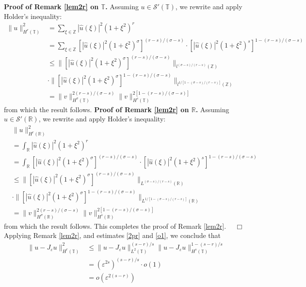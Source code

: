 \documentclass[12pt,reqno]{amsart}
\newcommand{\rr}{\mathbb{R}}
\newcommand{\zz}{\mathbb{Z}}
\newcommand{\ci}{\mathbb{T}}
\newcommand{\ee}{\varepsilon}
\theoremstyle{plain}  %
\theoremstyle{definition}
\begin{document}
{\bf Proof of Remark \ref{lem2r} on $\ci$.}
Assuming $u \in \mathcal{S'(\ci)}$,
we rewrite and apply Holder's inequality:
\begin{equation*}
	\begin{split}
		\|u\|_{H^{r}(\ci)}^2
		& = \sum_{\xi \in \zz} |\widehat{u}(\xi)|^2 (1 + \xi^2)^{r}
		\\
		& = \sum_{\xi \in \zz}
		\left [|\widehat{u}(\xi)|^2 (1 + \xi^2)^\sigma \right ]^{(r-s)/(\sigma -s)}
		\cdot \left [ |\widehat{u}(\xi )
		|^2 (1+ \xi^2)^s \right ] ^{1 - (r-s)/(\sigma -s)} 
		\\
		& \le \|\left[ |\widehat{u}(\xi)|^2 (1 + \xi^2)^\sigma
		\right]^{(r-s)/(\sigma -s)} \|_{l^{(\sigma -s)/(r-s)}(\zz)}
		\\
		& \cdot \|\left[ |\widehat{u}(\xi)|^2 (1 + \xi^2)^\sigma
		\right]^{1- (r-s)/(\sigma -s)} \|_{l^{1/[1 -(\sigma -s)/(r-s)]}(\zz)}
		\\
		& = \|v\|_{H^\sigma(\ci)}^{2(r-s)/(\sigma -s)}
		\|v\|_{H^s(\ci)}^{2[1 - (r-s)/(\sigma -s)]}
	\end{split}
\end{equation*}
from which the result follows.
\vskip0.1in
{\bf Proof of Remark \ref{lem2r} on $\rr$.}
Assuming $u \in \mathcal{S'(\rr)}$,
we rewrite and apply Holder's inequality:
\begin{equation*}
	\begin{split}
		&\|u\|_{H^{r}(\rr)}^2
		\\
		& = \int_\rr |\widehat{u}(\xi)|^2 (1 + \xi^2)^{r}
		\\
		& = \int_\rr
		\left [|\widehat{u}(\xi)|^2 (1 + \xi^2)^\sigma \right ]^{(r-s)/(\sigma -s)}
		\cdot \left [ |\widehat{u}(\xi )
		|^2 (1+ \xi^2)^s \right ] ^{1 - (r-s)/(\sigma -s)} 
		\\
		& \le \|\left[ |\widehat{u}(\xi)|^2 (1 + \xi^2)^\sigma
		\right]^{(r-s)/(\sigma -s)} \|_{L^{(\sigma -s)/(r-s)}(\rr)}
		\\
		& \cdot \|\left[ |\widehat{u}(\xi)|^2 (1 + \xi^2)^\sigma
		\right]^{1- (r-s)/(\sigma -s)} \|_{L^{1/[1 -(\sigma 
		-s)/(r-s)]}(\rr)}
		\\
		& = \|v\|_{H^\sigma(\rr)}^{2(r-s)/(\sigma -s)}
		\|v\|_{H^s(\rr)}^{2[1 - (r-s)/(\sigma -s)]}
	\end{split}
\end{equation*}
from which the result follows. This completes the proof of Remark 
\ref{lem2r}. $\quad \Box$
\vskip0.1in
Applying Remark \ref{lem2r}, and estimates \eqref{2pr} and \eqref{o1}, we conclude that
\begin{equation*}
	\begin{split}
		\|u - J_\ee u \|_{H^r(\ci)}^2
		& \le \|u - J_\ee u
		\|_{L^2(\ci)}^{(s-r)/s} \|u - J_\ee u \|_{H^s(\ci)}^{1 -
		(s-r)/s}
		\\
		& = \left( \ee^{2s} \right)^{(s-r)/s} \cdot o(1)
		\\
		& = o(\ee^{2(s-r)})
	\end{split}
\end{equation*}
\end{document}
